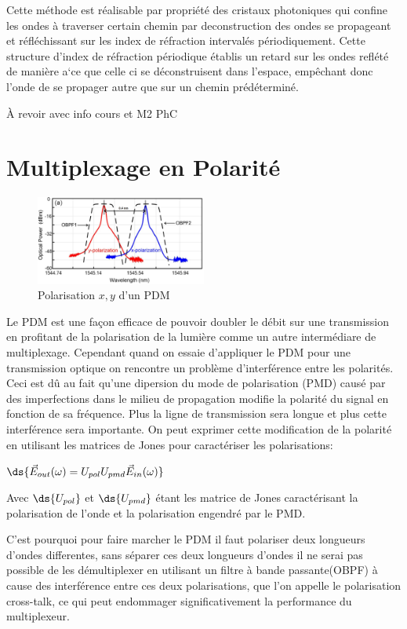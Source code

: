 \documentclass[oneside]{book}
\begin{document}
			Cette méthode est réalisable par propriété des cristaux photoniques qui confine les ondes à traverser certain chemin par deconstruction des ondes se propageant et réfléchissant sur les index de réfraction intervalés périodiquement. Cette structure d'index de réfraction périodique établis un retard sur les ondes reflété de manière a`ce que celle ci se déconstruisent dans l'espace, empêchant donc l'onde de se propager autre que sur un chemin prédéterminé. 

			À revoir avec info cours et M2 PhC

		\section{Multiplexage en Polarité}

		\begin{figure}[ht!]
			\centering
			\includegraphics[width=0.5\textwidth]{./object/PDMW.png}
			\caption{Polarisation $x,y$ d'un PDM}
		\end{figure}

		Le PDM est une façon efficace de pouvoir doubler le débit sur une transmission en profitant de la polarisation de la lumière comme un autre intermédiare de multiplexage. Cependant quand on essaie d'appliquer le PDM pour une transmission optique on rencontre un problème d'interférence entre les polarités. Ceci est dû au fait qu'une dipersion du mode de polarisation (PMD) causé par des imperfections dans le milieu de propagation modifie la polarité du signal en fonction de sa fréquence. Plus la ligne de transmission sera longue et plus cette interférence sera importante. On peut exprimer cette modification de la polarité en utilisant les matrices de Jones pour caractériser les polarisations\cite{PDM2}: \\
	\centerline{$\ds{\vec{E}_{out}(\omega)=U_{pol}U_{pmd}\vec{E}_{in}(\omega )}$}

	Avec $\ds{U_{pol}}$ et $\ds{U_{pmd}}$ étant les matrice de Jones caractérisant la polarisation de l'onde et la polarisation engendré par le PMD. 

		C'est pourquoi pour faire marcher le PDM il faut polariser deux longueurs d'ondes differentes, sans séparer ces deux longueurs d'ondes il ne serai pas possible de les démultiplexer en utilisant un filtre à bande passante(OBPF) à cause des interférence entre ces deux polarisations, que l'on appelle le polarisation cross-talk, ce qui peut endommager significativement la performance du multiplexeur\cite{PDM}. 
\end{document}
